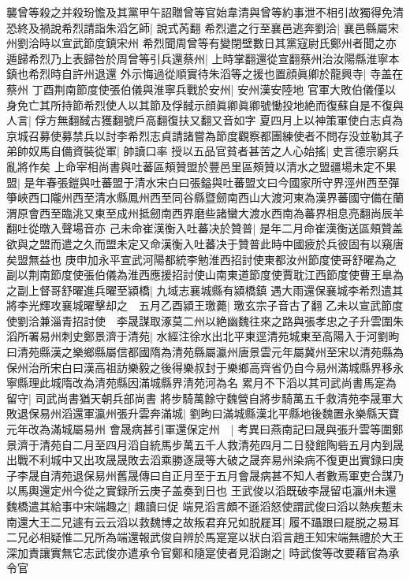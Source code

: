 襲曾等殺之并殺玢憺及其黨甲午詔贈曾等官始韋清與曾等約事泄不相引故獨得免清恐終及禍說希烈請詣朱滔乞師|{
	說式芮翻}
希烈遣之行至襄邑逃奔劉洽|{
	襄邑縣屬宋州劉洽時以宣武節度鎮宋州}
希烈聞周曾等有變閉壁數日其黨寇尉氏鄭州者聞之亦遁歸希烈乃上表歸咎於周曾等引兵還蔡州|{
	上時掌翻還從宣翻蔡州治汝陽縣淮寧本鎮也希烈時自許州退還}
外示悔過從順實待朱滔等之援也置顔眞卿於龍興寺|{
	寺盖在蔡州}
丁酉荆南節度使張伯儀與淮寧兵戰於安州|{
	安州漢安陸地}
官軍大敗伯儀僅以身免亡其所持節希烈使人以其節及俘馘示顔眞卿眞卿號慟投地絶而復蘇自是不復與人言|{
	俘方無翻馘古獲翻號戶高翻復扶又翻又音如字}
夏四月上以神策軍使白志貞為京城召募使募禁兵以討李希烈志貞請諸嘗為節度觀察都團練使者不問存没並勒其子弟帥奴馬自備資裝從軍|{
	帥讀口率}
授以五品官貧者甚苦之人心始搖|{
	史言德宗窮兵亂將作矣}
上命宰相尚書與吐蕃區頰贊盟於豐邑里區頰贊以清水之盟疆場未定不果盟|{
	是年春張鎧與吐蕃盟于清水宋白曰張鎰與吐蕃盟文曰今國家所守界涇州西至彈箏峽西口隴州西至清水縣鳳州西至同谷縣暨劒南西山大渡河東為漢界蕃國守備在蘭渭原會西至臨洮又東至成州抵劒南西界磨些諸蠻大渡水西南為蕃界相息亮翻尚辰羊翻吐從暾入聲場音亦}
己未命崔漢衡入吐蕃决於贊普|{
	是年二月命崔漢衡送區頰贊盖欲與之盟而遣之久而盟未定又命漢衡入吐蕃决于贊普此時中國疲於兵彼固有以窺唐矣盟無益也}
庚申加永平宣武河陽都統李勉淮西招討使東都汝州節度使哥舒曜為之副以荆南節度使張伯儀為淮西應援招討使山南東道節度使賈耽江西節度使曹王臯為之副上督哥舒曜進兵曜至潁橋|{
	九域志襄城縣有潁橋鎮}
遇大雨還保襄城李希烈遣其將李光輝攻襄城曜擊却之　五月乙酉潁王璬薨|{
	璬玄宗子音古了翻}
乙未以宣武節度使劉洽兼淄青招討使　李晟謀取涿莫二州以絶幽魏往來之路與張孝忠之子升雲圍朱滔所署易州刺史鄭景濟于清苑|{
	水經注徐水出北平東逕清苑城東至高陽入于河劉昫曰清苑縣漢之樂鄉縣屬信都國隋為清苑縣屬瀛州唐景雲元年屬冀州至宋以清苑縣為保州治所宋白曰漢高祖訪樂毅之後得樂叔封于樂鄉高齊省仍自今易州滿城縣界移永寧縣理此城隋改為清苑縣因滿城縣界清苑河為名}
累月不下滔以其司武尚書馬寔為留守|{
	司武尚書猶天朝兵部尚書}
將步騎萬餘守魏營自將步騎萬五千救清苑李晟軍大敗退保易州滔還軍瀛州張升雲奔滿城|{
	劉昫曰滿城縣漢北平縣地後魏置永樂縣天寶元年改為滿城屬易州}
會晟病甚引軍還保定州　|{
	考異曰燕南記曰晟與張升雲等圍鄭景濟于清苑自二月至四月滔自統馬步萬五千人救清苑四月二日發館陶砦五月内到晟出戰不利城中又出攻晟晟敗去滔乘勝逐晟等大破之晟奔易州染病不復更出實録曰庚子李晟自清苑退保易州舊晟傳曰自正月至于五月會晟病甚不知人者數焉軍吏合謀乃以馬輿還定州今從之實録所云庚子盖奏到日也}
王武俊以滔既破李晟留屯瀛州未還魏橋遣其給事中宋端趣之|{
	趣讀曰促}
端見滔言頗不遜滔怒使謂武俊曰滔以熱疾蹔未南還大王二兄遽有云云滔以救魏博之故叛君弃兄如脱屣耳|{
	履不躡跟曰屣脱之易耳}
二兄必相疑惟二兄所為端還報武俊自辨於馬寔寔以狀白滔言趙王知宋端無禮於大王深加責讓實無它志武俊亦遣承令官鄭和隨寔使者見滔謝之|{
	時武俊等改要藉官為承令官}
